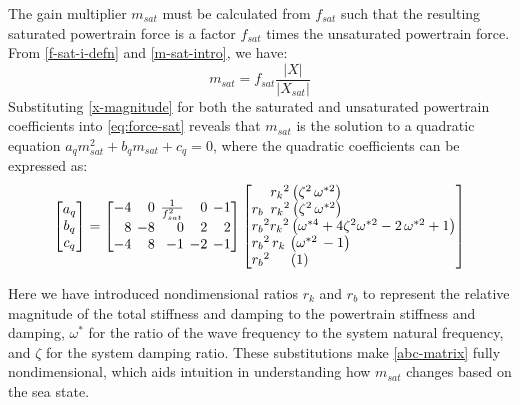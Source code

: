 \documentclass{ifacconf}
\begin{document}
The gain multiplier $m_{sat}$ must be calculated from $f_{sat}$ such that the resulting saturated powertrain force is a factor $f_{sat}$ times the unsaturated powertrain force. From \eqref{f-sat-i-defn} and \eqref{m-sat-intro}, we have:
\begin{equation} \label{eq:force-sat}
    m_{sat} = f_{sat} \frac{|X|} {|X_{sat}|}
\end{equation} 
Substituting \eqref{x-magnitude} for both the saturated and unsaturated powertrain coefficients into \eqref{eq:force-sat} reveals that $m_{sat}$ is the solution to a quadratic equation $a_q m_{sat}^2 + b_q m_{sat} + c_q = 0$, where the quadratic coefficients can be expressed as:
\begin{equation}\label{abc-matrix}
    \begin{bmatrix}
        a_q \\ b_q \\ c_q
    \end{bmatrix}
    = 
    \begingroup %
    \setlength\arraycolsep{2pt}
    \begin{bmatrix*}[r] -4 & 0 & \frac{1}{f_{sat}^2} & 0 & -1\\
    8 & -8 & 0 & 2 & 2\\ -4 & 8 & -1 & -2 & -1 \end{bmatrix*}
    \endgroup
    \begin{bmatrix*}[l] 
    ~~~~{r_{k}}^2\left(\zeta^2\,\omega^{*2} \right)  \\
    r_{b}~\,{r_{k}}^2  \left(\zeta^2\,\omega^{*2} \right) \\
    {r_{b}}^2{r_{k}}^2 \left( \omega^{*4}+ 4\zeta^2\omega^{*2} - 2\,\omega^{*2} + 1 \right) \\
    {r_{b}}^2\,r_{k}\,\left(\omega^{*2} \, -1\right) \\
    {r_{b}}^2 ~~~~\left(1 \right)  
    \end{bmatrix*}
\end{equation}

Here we have introduced nondimensional ratios $r_k$ and $r_b$ to represent the relative magnitude of the total stiffness and damping to the powertrain stiffness and damping, $\omega^*$ for the ratio of the wave frequency to the system natural frequency, and $\zeta$ for the system damping ratio. These substitutions make \eqref{abc-matrix} fully nondimensional, which aids intuition in understanding how $m_{sat}$ changes based on the sea state.
\end{document}
